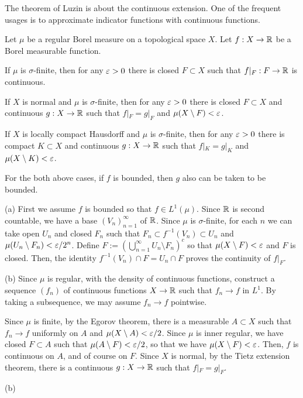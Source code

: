 \documentclass{../../large}
\begin{document}
\begin{prb}
The theorem of Luzin is about the continuous extension.
One of the frequent usages is to approximate indicator functions with continuous functions.

Let $\mu$ be a regular Borel measure on a topological space $X$.
Let $f:X\to\mathbb{R}$ be a Borel measurable function.
\begin{parts}
\item If $\mu$ is $\sigma$-finite, then for any $\varepsilon>0$ there is closed $F\subset X$ such that $f|_F:F\to\mathbb{R}$ is continuous.
\item If $X$ is normal and $\mu$ is $\sigma$-finite, then for any $\varepsilon>0$ there is closed $F\subset X$ and continuous $g:X\to\mathbb{R}$ such that $f|_F=g|_F$ and $\mu(X\setminus F)<\varepsilon$.
\item If $X$ is locally compact Hausdorff and $\mu$ is $\sigma$-finite, then for any $\varepsilon>0$ there is compact $K\subset X$ and continuous $g:X\to\mathbb{R}$ such that $f|_K=g|_K$ and $\mu(X\setminus K)<\varepsilon$.
\item For the both above cases, if $f$ is bounded, then $g$ also can be taken to be bounded.
\end{parts}
\end{prb}
\begin{pf}
(a)
First we assume $f$ is bounded so that $f\in L^1(\mu)$.
Since $\mathbb{R}$ is second countable, we have a base $(V_n)_{n=1}^\infty$ of $\mathbb{R}$.
Since $\mu$ is $\sigma$-finite, for each $n$ we can take open $U_n$ and closed $F_n$ such that $F_n\subset f^{-1}(V_n)\subset U_n$ and $\mu(U_n\setminus F_n)<\varepsilon/2^n$.
Define $F:=\left(\bigcup_{n=1}^\infty U_n\setminus F_n\right)^c$ so that $\mu(X\setminus F)<\varepsilon$ and $F$ is closed.
Then, the identity $f^{-1}(V_n)\cap F=U_n\cap F$ proves the continuity of $f|_F$.

(b)
Since $\mu$ is regular, with the density of continuous functions, construct a sequence $(f_n)$ of continuous functions $X\to\mathbb{R}$ such that $f_n\to f$ in $L^1$.
By taking a subsequence, we may assume $f_n\to f$ pointwise.

Since $\mu$ is finite, by the Egorov theorem, there is a measurable $A\subset X$ such that $f_n\to f$ uniformly on $A$ and $\mu(X\setminus A)<\varepsilon/2$.
Since $\mu$ is inner regular, we have closed $F\subset A$ such that $\mu(A\setminus F)<\varepsilon/2$, so that we have $\mu(X\setminus F)<\varepsilon$.
Then, $f$ is continuous on $A$, and of course on $F$.
Since $X$ is normal, by the Tietz extension theorem, there is a continuous $g:X\to\mathbb{R}$ such that $f|_F=g|_F$.

(b)

\end{pf}
\end{document}
